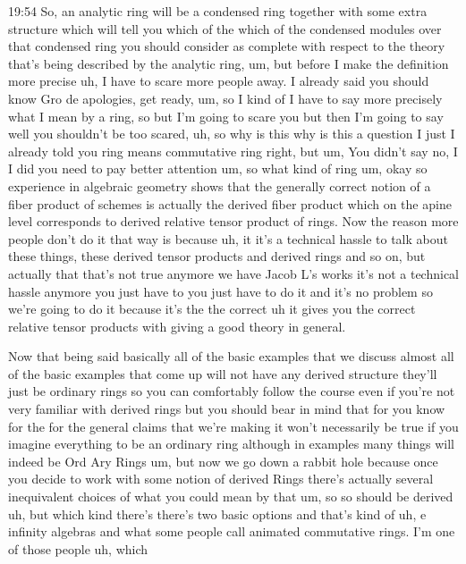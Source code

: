 \begin{unfinished}{19:54}
So, an analytic ring will be a condensed ring together with some extra structure which will tell you which of the which of the condensed modules over that condensed ring you should consider as complete with respect to the theory that's being described by the analytic ring, um, but before I make the definition more precise uh, I have to scare more people away. I already said you should know Gro de apologies, get ready, um, so I kind of I have to say more precisely what I mean by a ring, so but I'm going to scare you but then I'm going to say well you shouldn't be too scared, uh, so why is this why is this a question I just I already told you ring means commutative ring right, but um, You didn't say no, I I did you need to pay better attention um, so what kind of ring um, okay so experience in algebraic geometry shows that the generally correct notion of a fiber product of schemes is actually the derived fiber product which on the apine level corresponds to derived relative tensor product of rings. Now the reason more people don't do it that way is because uh, it it's a technical hassle to talk about these things, these derived tensor products and derived rings and so on, but actually that that's not true anymore we have Jacob L's works it's not a technical hassle anymore you just have to you just have to do it and it's no problem so we're going to do it because it's the the correct uh it gives you the correct relative tensor products with giving a good theory in general.

Now that being said basically all of the basic examples that we discuss almost all of the basic examples that come up will not have any derived structure they'll just be ordinary rings so you can comfortably follow the course even if you're not very familiar with derived rings but you should bear in mind that for you know for the for the general claims that we're making it won't necessarily be true if you imagine everything to be an ordinary ring although in examples many things will indeed be Ord Ary Rings um, but now we go down a rabbit hole because once you decide to work with some notion of derived Rings there's actually several inequivalent choices of what you could mean by that um, so so should be derived uh, but which kind there's there's two basic options and that's kind of uh, e infinity algebras and what some people call animated commutative rings. I'm one of those people uh, which


\end{unfinished}
